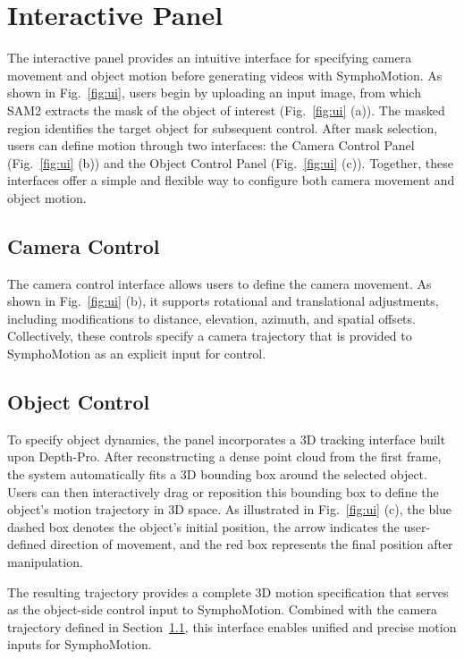\section{Interactive Panel}
\label{sec:panel}
The interactive panel provides an intuitive interface for specifying camera movement and object motion before generating videos with SymphoMotion. As shown in Fig.~\ref{fig:ui}, users begin by uploading an input image, from which SAM2 extracts the mask of the object of interest (Fig.~\ref{fig:ui} (a)). The masked region identifies the target object for subsequent control.
After mask selection, users can define motion through two interfaces: the Camera Control Panel (Fig.~\ref{fig:ui} (b)) and the Object Control Panel (Fig.~\ref{fig:ui} (c)). Together, these interfaces offer a simple and flexible way to configure both camera movement and object motion.
\subsection{Camera Control}
\label{sec:panel-camera}
The camera control interface allows users to define the camera movement. As shown in Fig.~\ref{fig:ui} (b), it supports rotational and translational adjustments, including modifications to distance, elevation, azimuth, and spatial offsets. Collectively, these controls specify a camera trajectory that is provided to SymphoMotion as an explicit input for control.

\subsection{Object Control}
\label{sec:panel-object}
To specify object dynamics, the panel incorporates a 3D tracking interface built upon Depth-Pro. After reconstructing a dense point cloud from the first frame, the system automatically fits a 3D bounding box around the selected object. Users can then interactively drag or reposition this bounding box to define the object’s motion trajectory in 3D space. As illustrated in Fig.~\ref{fig:ui}  (c), the blue dashed box denotes the object's initial position, the arrow indicates the user-defined direction of movement, and the red box represents the final position after manipulation.

The resulting trajectory provides a complete 3D motion specification that serves as the object-side control input to SymphoMotion. Combined with the camera trajectory defined in Section~\ref{sec:panel-camera}, this interface enables unified and precise motion inputs for SymphoMotion.



